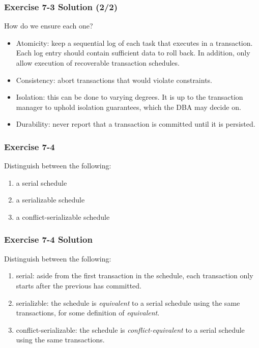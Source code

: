 \begin{frame}
\frametitle{Exercise 7-3 Solution (2/2)}

How do we ensure each one?

\begin{itemize}
  \item Atomicity: keep a sequential log of each task that executes in a transaction. Each log entry should contain sufficient data to roll back. In addition, only allow execution of recoverable transaction schedules.
  \item Consistency: abort transactions that would violate constraints.
  \item Isolation: this can be done to varying degrees. It is up to the transaction manager to uphold isolation guarantees, which the DBA may decide on.
  \item Durability: never report that a transaction is committed until it is persisted.
\end{itemize}

\end{frame}


\begin{frame}
\frametitle{Exercise 7-4}

Distinguish between the following:

\begin{enumerate}
  \item a serial schedule
  \item a serializable schedule
  \item a conflict-serializable schedule
\end{enumerate}

\end{frame}


\begin{frame}
\frametitle{Exercise 7-4 Solution}

Distinguish between the following:

\begin{enumerate}
  \item serial: aside from the first transaction in the schedule, each transaction only starts after the previous has committed.
  \item serializble: the schedule is \textit{equivalent} to a serial schedule using the same transactions, for some definition of \textit{equivalent}.
  \item conflict-serializable: the schedule is \textit{conflict-equivalent} to a serial schedule using the same transactions.
\end{enumerate}

\end{frame}



